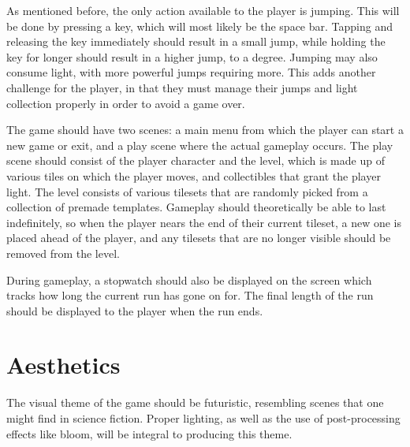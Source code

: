\documentclass[10pt]{article}
\begin{document}
As mentioned before, the only action available to the player is jumping. This will be done by pressing a key, which will most likely be the space bar.
Tapping and releasing the key immediately should result in a small jump, while holding the key for longer should result in a higher jump, to a degree.
Jumping may also consume light, with more powerful jumps requiring more. This adds another challenge for the player, in that they must manage their jumps
and light collection properly in order to avoid a game over.

The game should have two scenes: a main menu from which the player can start a new game or exit, and a play scene where the actual gameplay occurs.
The play scene should consist of the player character and the level, which is made up of various tiles on which the player moves, and collectibles
that grant the player light. The level consists of various tilesets that are randomly picked from a collection of premade templates. Gameplay should
theoretically be able to last indefinitely, so when the player nears the end of their current tileset, a new one is placed ahead of the player,
and any tilesets that are no longer visible should be removed from the level.

During gameplay, a stopwatch should also be displayed on the screen which tracks how long the current run has gone on for.
The final length of the run should be displayed to the player when the run ends.

\section{Aesthetics}

The visual theme of the game should be futuristic, resembling scenes that one might find in science fiction.
Proper lighting, as well as the use of post-processing effects like bloom, will be integral to producing this theme.
\end{document}
